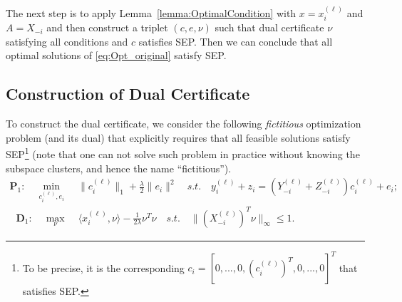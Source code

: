 \documentclass[twoside,11pt]{article}
\numberwithin{equation}{section}
\begin{document}
The next step is to apply Lemma~\ref{lemma:OptimalCondition} with $x=x_i^{(\ell)}$ and $A=X_{-i}$ and then construct a triplet $(c,e,\nu)$ such that dual certificate $\nu$ satisfying all conditions and $c$ satisfies SEP. Then we can conclude that all optimal solutions of \eqref{eq:Opt_original} satisfy SEP.

\subsection{Construction of Dual Certificate}\label{sec:construct_nu}
To construct the dual certificate, we consider the following {\em fictitious} optimization problem (and its dual) that explicitly requires that all feasible solutions satisfy SEP\footnote{To be precise, it is the corresponding $c_i=[0,...,0,(c^{(\ell)}_i)^T,0,...,0]^T$ that satisfies SEP.} (note that one can not solve such problem in practice without knowing the subspace clusters, and hence the name ``fictitious'').
\begin{equation}\label{eq:Opt_fictitious2}
\begin{aligned}
\mathbf{P}_1: \quad \min_{c^{(\ell)}_i, e_i} \; &\|c^{(\ell)}_i\|_1+\frac{\lambda}{2}\|e_i\|^2 \quad
s.t. \quad y^{(\ell)}_i+z_i=(Y^{(\ell)}_{-i}+Z^{(\ell)}_{-i})c^{(\ell)}_i+e_i;
\end{aligned}
\end{equation}
\begin{equation}\label{eq:dual_fictitious2}
\begin{aligned}
\mathbf{D}_1: \quad \max_{\nu} \; &\langle x_i^{(\ell)},\nu \rangle - \frac{1}{2\lambda}\nu^T\nu\quad
s.t. \quad \|(X^{(\ell)}_{-i})^T\nu\|_{\infty} \leq 1.\quad\quad\quad\quad\quad\quad
\end{aligned}
\end{equation}
\end{document}
